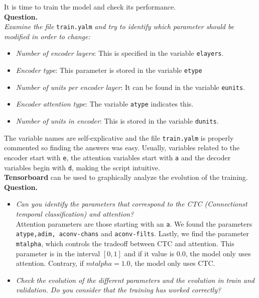 \documentclass[a4paper]{article}
\def\inline{\lstinline[basicstyle=\ttfamily,keywordstyle={}]}
\begin{document}
It is time to train the model and check its performance.\\

\textbf{Question.}\\

\emph{Examine the file} \inline{train.yalm} \emph{and try to identify which parameter should be modified in order to change:}
\begin{itemize}
  \item \emph{Number of encoder layers}: This is specified in the variable \inline{elayers}.
  \item \emph{Encoder type}: This parameter is stored in the variable \inline{etype}
  \item \emph{Number of units per encoder layer}: It can be found in the variable \inline{eunits}.
  \item \emph{Encoder attention type}: The variable \inline{atype} indicates this.
  \item \emph{Number of units in encoder}: This is stored in the variable \inline{dunits}.

\end{itemize}
The variable names are self-explicative and the file \inline{train.yalm} is properly commented so finding the answers was easy. Usually, variables related to the encoder start with \inline{e}, the attention variables start with \inline{a} and the decoder variables begin with \inline{d}, making the script intuitive.\\

\textbf{Tensorboard} can be used to graphically analyze the evolution of the training.\\

\textbf{Question.}
\begin{itemize}
  \item \emph{Can you identify the parameters that correspond to the CTC (Connectionst temporal classification) and attention?}\\
        Attention parameters are those starting with an \inline{a}. We found the parameters \inline{atype,adim, aconv-chans} and \inline{aconv-filts}. Lastly, we find the parameter \inline{mtalpha}, which controls the tradeoff between CTC and attention. This parameter is in the interval \([0,1]\) and if it value is  \(0.0\), the model only uses attention. Contrary, if \(mtalpha = 1.0\), the model only uses CTC.
  \item \emph{Check the evolution of the different parameters and the evolution in train and validation. Do you consider that the training has worked correctly? }
\end{itemize}
\end{document}
